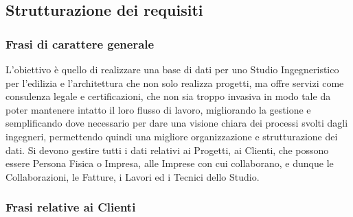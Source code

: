 \documentclass{elegantbook}
\begin{document}
	\subsection{Strutturazione dei requisiti}
	\subsubsection{Frasi di carattere generale}
	
	L'obiettivo è quello di realizzare una base di dati per uno Studio Ingegneristico per l'edilizia e l'architettura che non solo realizza progetti, ma offre servizi come consulenza legale e certificazioni, che non sia troppo invasiva in modo tale da poter mantenere intatto il loro flusso di lavoro, migliorando la gestione e semplificando dove necessario per dare una visione chiara dei processi svolti dagli ingegneri, permettendo quindi una migliore organizzazione e strutturazione dei dati.
	Si devono gestire tutti i dati relativi ai Progetti, ai Clienti, che possono essere Persona Fisica o Impresa, alle Imprese con cui collaborano, e dunque le Collaborazioni, le Fatture, i Lavori ed i Tecnici dello Studio.
	\subsubsection{Frasi relative ai Clienti}
	
\end{document}
